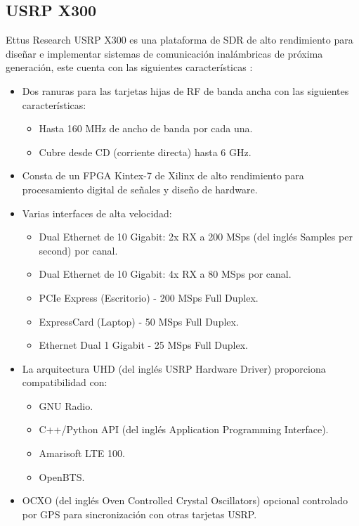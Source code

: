 \documentclass[12pt]{difu100cia} %
\begin{document}
\subsection{USRP X300}

Ettus Research USRP X300 es una plataforma de SDR de alto rendimiento para diseñar e implementar sistemas de comunicación inalámbricas de próxima generación, este cuenta con las siguientes características \cite{ettusresearch}:

\begin{itemize}
    \item Dos ranuras para las tarjetas hijas de RF de banda ancha con las siguientes características:
    \begin{itemize}
        \item Hasta 160 MHz de ancho de banda por cada una. 
        \item Cubre desde CD (corriente directa) hasta 6 GHz. 
    \end{itemize}
    \item Consta de un FPGA Kintex-7 de Xilinx de alto rendimiento para procesamiento digital de señales y diseño de hardware.
    \item Varias interfaces de alta velocidad: 
    
    \begin{itemize}
        \item Dual Ethernet de 10 Gigabit:  2x RX a 200 MSps (del inglés Samples per second) por canal.
        \item Dual Ethernet de 10 Gigabit: 4x RX a 80 MSps por canal.
        \item PCIe Express (Escritorio) - 200 MSps Full Duplex.
        \item ExpressCard (Laptop) - 50 MSps Full Duplex.
        \item Ethernet Dual 1 Gigabit - 25 MSps Full Duplex.
    \end{itemize}
    \item La arquitectura UHD (del inglés USRP Hardware Driver) proporciona compatibilidad con:
    \begin{itemize}
        \item GNU Radio.
        \item C++/Python API (del inglés Application Programming Interface).
        \item Amarisoft LTE 100.
        \item OpenBTS.
    \end{itemize}
    
    \item OCXO (del inglés Oven Controlled Crystal Oscillators) opcional controlado por GPS para sincronización con otras tarjetas USRP.
\end{itemize}
\end{document}
